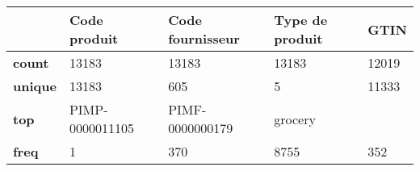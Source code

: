 \begin{tabular}{lXXXX}
\toprule
{} &     Code produit & Code fournisseur & Type de produit &   GTIN \\
\midrule
\textbf{count } &            13183 &            13183 &           13183 &  12019 \\
\textbf{unique} &            13183 &              605 &               5 &  11333 \\
\textbf{top   } &  PIMP-0000011105 &  PIMF-0000000179 &         grocery &        \\
\textbf{freq  } &                1 &              370 &            8755 &    352 \\
\bottomrule
\end{tabular}
